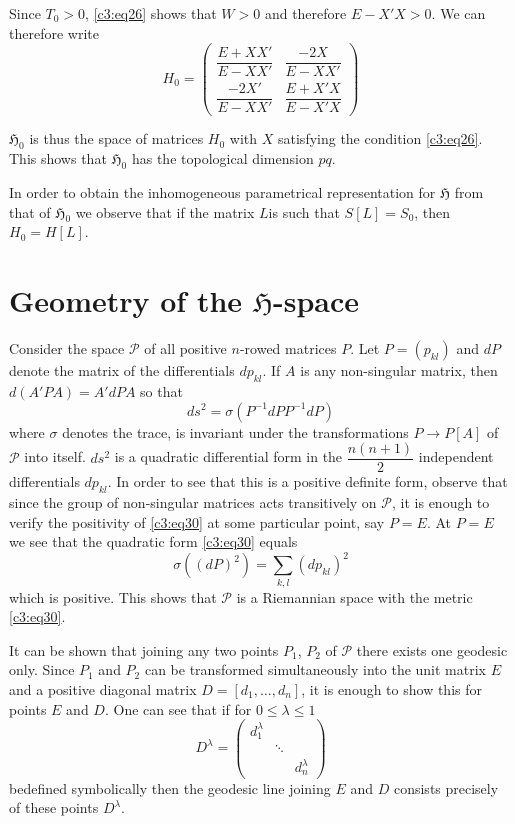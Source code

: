 Since $T_{0}>0$, \eqref{c3:eq26} shows that $W>0$ and therefore
$E-X'X>0$. We can therefore write
\begin{equation*}
H_{0}=
\begin{pmatrix}
\dfrac{E+XX'}{E-XX'} & \dfrac{-2X}{E-XX'}\\[10pt]
\dfrac{-2X'}{E-XX'} & \dfrac{E+X'X}{E-X'X}
\end{pmatrix}\tag{29}\label{c3:eq29}
\end{equation*}

$\mathfrak{H}_{0}$ is thus the space of matrices $H_{0}$ with $X$
satisfying the condition \eqref{c3:eq26}. This shows that
$\mathfrak{H}_{0}$ has the topological dimension $pq$.

In order to obtain the inhomogeneous parametrical representation for
$\mathfrak{H}$ from that of $\mathfrak{H}_{0}$ we observe that if the
matrix $L$\pageoriginale is such that $S[L]=S_{0}$, then $H_{0}=H[L]$.


\section{Geometry of the \texorpdfstring{$\mathfrak{H}$}{H}-space}\label{chap3:sec3}%

Consider the space $\mathscr{P}$ of all positive $n$-rowed matrices
$P$. Let $P=(p_{kl})$ and $dP$ denote the matrix of the differentials
$dp_{kl}$. If $A$ is any non-singular matrix, then $d(A'PA)=A'dPA$ so
that 
\begin{equation*}
ds^{2}=\sigma(P^{-1}dPP^{-1}dP)\tag{30}\label{c3:eq30}
\end{equation*}
where $\sigma$ denotes the trace, is invariant under the
transformations $P\to P[A]$ of $\mathscr{P}$ into itself. $ds^{2}$ is
a quadratic differential form in the $\dfrac{n(n+1)}{2}$ independent
differentials $dp_{kl}$. In order to see that this is a positive
definite form, observe that since the group of non-singular matrices
acts transitively on $\mathscr{P}$, it is enough to verify the
positivity of \eqref{c3:eq30} at some particular point, say $P=E$. At $P=E$
we see that the quadratic form \eqref{c3:eq30} equals
$$
\sigma((dP)^{2})=\sum_{k,l}(dp_{kl})^{2}
$$
which is positive. This shows that $\mathscr{P}$ is a Riemannian space
with the metric \eqref{c3:eq30}.

It can be shown that joining any two points $P_{1}$, $P_{2}$ of
$\mathscr{P}$ there exists one geodesic only. Since $P_{1}$ and
$P_{2}$ can be transformed simultaneously into the unit matrix $E$ and
a positive diagonal matrix $D=[d_{1},\ldots,d_{n}]$, it is enough to
show this for points $E$ and $D$. One can see that if for $0\leq
\lambda \leq 1$
$$
D^{\lambda}=
\begin{pmatrix}
d_{1}^{\lambda} & & \\
 &\ddots &\\
 & & d^{\lambda}_{n}
\end{pmatrix}
$$
be\pageoriginale defined symbolically then the geodesic line joining
$E$ and $D$ consists precisely of these points $D^{\lambda}$.


